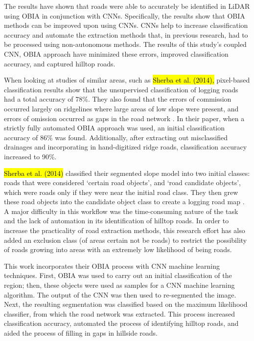 \documentclass[remotesensing,article,accept,pdftex,moreauthors]{Definitions/mdpi}
\begin{document}
The results have shown that roads were able to accurately be identified in LiDAR using OBIA in conjunction with CNNs. Specifically, the results show that OBIA methods can be improved upon using CNNs. CNNs help to increase classification accuracy and automate the extraction methods that, in previous research, had to be processed using non-autonomous methods. The results of this study’s coupled CNN, OBIA approach have minimized these errors, improved classification accuracy, and captured hilltop roads.

When looking at studies of similar areas, such as \hl{Sherba et al. (2014),} %
 pixel-based classification results show that the unsupervised classification of logging roads had a total accuracy of 78\%. They also found that the errors of commission occurred largely on ridgelines where large areas of low slope were present, and errors of omission occurred as gaps in the road network \cite{sherba}. In their paper, when a strictly fully automated OBIA approach was used, an initial classification accuracy of 86\% was found. Additionally, after extracting out misclassified drainages and incorporating in hand-digitized ridge roads, classification accuracy increased to 90\%.

\hl{Sherba et al. (2014)} classified their segmented slope model into two initial classes: roads that were considered ‘certain road objects’, and ‘road candidate objects’, which were roads only if they were near the initial road class. They then grew these road objects into the candidate object class to create a logging road map \cite{sherba}. A major difficulty in this workflow was the time-consuming nature of the task and the lack of automation in its identification of hilltop roads. In order to increase the practicality of road extraction methods, this research effort has also added an exclusion class (of areas certain not be roads) to restrict the possibility of roads growing into areas with an extremely low likelihood of being roads.

This work incorporates their OBIA process with CNN machine learning techniques. First, OBIA was used to carry out an initial classification of the region; then, these objects were used as samples for a CNN machine learning algorithm. The output of the CNN was then used to re-segmented the image. Next, the resulting segmentation was classified based on the maximum likelihood classifier, from which the road network was extracted. This process increased classification accuracy, automated the process of identifying hilltop roads, and aided the process of filling in gaps in hillside roads.
\end{document}
